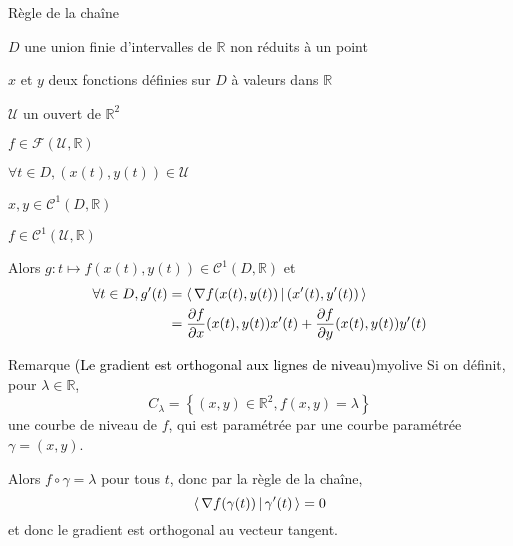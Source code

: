     \begin{prop}{Règle de la chaîne}{}
        \begin{soient}
            \item $D$ une union finie d’intervalles de $\mathbb{R}$ non réduits à un point
            \item $x$ et $y$ deux fonctions définies sur $D$ à valeurs dans $\mathbb{R}$
            \item $\mathcal{U}$ un ouvert de $\mathbb{R}^2$
            \item $f \in \mathcal{F}(\mathcal{U},\mathbb{R})$
        \end{soient}
        \begin{suppose}
            \item $\forall t \in D, (x(t),y(t)) \in \mathcal{U}$
            \item $x,y \in \mathcal{C}^1(D,\mathbb{R})$
            \item $f \in \mathcal{C}^1(\mathcal{U},\mathbb{R})$
        \end{suppose}
        Alors $g : t \mapsto f(x(t),y(t)) \in \mathcal{C}^1(D,\mathbb{R})$ et
        \begin{align*}
            \forall t \in D, g'(t) &= \left<\,\nabla f(x(t),y(t))\,\middle|\,(x'(t),y'(t))\,\right> \\
            &= \frac{\partial f}{\partial x}(x(t),y(t)) x'(t) + \frac{\partial f}{\partial y}(x(t),y(t)) y'(t)
        \end{align*} 
    \end{prop}

    \begin{omed}{Remarque \textcolor{black}{(Le gradient est orthogonal aux lignes de niveau)}}{myolive}
        Si on définit, pour $\lambda \in \mathbb{R}$, 
        \[ C_{\lambda} = \left\{ (x,y) \in \mathbb{R}^2, f(x,y) = \lambda  \right\}\] 
        une courbe de niveau de $f$, qui est paramétrée par une courbe paramétrée $\gamma = (x,y)$.

        Alors $f \circ \gamma = \lambda$ pour tous $t$, donc par la règle de la chaîne, 
        \[ \left<\,\nabla f(\gamma(t))\,\middle|\,\gamma'(t)\,\right> = 0 \] 
        et donc le gradient est orthogonal au vecteur tangent.
    \end{omed}

